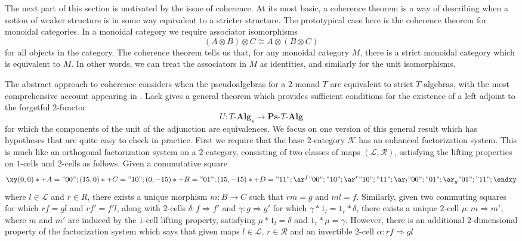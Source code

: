 \documentclass{amsbook} %
\newcommand{\mb}{\mathbf}
\newcommand{\m}[1]{\mathcal{#1}}
\numberwithin{section}{chapter}
\begin{document}
The next part of this section is motivated by the issue of coherence. At its most basic, a coherence theorem is a way of describing when a notion of weaker structure is in some way equivalent to a stricter structure. The prototypical case here is the coherence theorem for monoidal categories. In a monoidal category we require associator isomorphisms
    \[
        \left( A \otimes B \right) \otimes C \cong A \otimes \left( B \otimes C \right)
    \]
for all objects in the category. The coherence theorem tells us that, for any monoidal category $M$, there is a strict monoidal category which is equivalent to $M$.  In other words, we can treat the associators in $M$ as identities, and similarly for the unit isomorphisms.

The abstract approach to coherence considers when the pseudoalgebras for a $2$-monad $T$ are equivalent to strict $T$-algebras, with the most comprehensive account appearing in \cite{lack-cod}.  Lack gives a general theorem which provides sufficient conditions for the existence of a left adjoint to the forgetful $2$-functor
    \[
        U \colon T\mbox{-}\mb{Alg}_s \rightarrow \mb{Ps}\mbox{-}T\mbox{-}\mb{Alg}
    \]
for which the components of the unit of the adjunction are equivalences. We focus on one version of this general result which has hypotheses that are quite easy to check in practice.  First we require that the base 2-category $\mathcal{K}$ has an enhanced factorization system. This is much like an orthogonal factorization system on a $2$-category, consisting of two classes of maps $(\mathcal{L},\mathcal{R})$, satisfying the lifting properties on $1$-cells and $2$-cells as follows. Given a commutative square
     \[
        \xy
            (0,0)*+{A}="00";
            (15,0)*+{C}="10";
            (0,-15)*+{B}="01";
            (15,-15)*+{D}="11";
            {\ar^{f} "00" ; "10"};
            {\ar^{r} "10" ; "11"};
            {\ar_{l} "00" ; "01"};
            {\ar_{g} "01" ; "11"};
        \endxy
     \]
where $l \in \m{L}$ and $r \in {R}$, there exists a unique morphism $m \colon B \rightarrow C$ such that $rm = g$ and $ml = f$. Similarly, given two commuting squares for which $rf = gl$ and $rf' = f'l$, along with $2$-cells $\delta \colon f \Rightarrow f'$ and $\gamma \colon g \Rightarrow g'$ for which $\gamma \ast 1_l = 1_r \ast \delta$, there exists a unique $2$-cell $\mu \colon m \Rightarrow m'$, where $m$ and $m'$ are induced by the $1$-cell lifting property, satisfying $\mu \ast 1_l = \delta$ and $1_r \ast \mu = \gamma$. However, there is an additional $2$-dimensional property of the factorization system which says that given maps $l \in \m{L}$, $r \in \m{R}$ and an invertible $2$-cell $\alpha \colon rf \Rightarrow gl$
\end{document}

